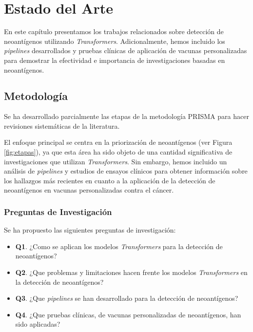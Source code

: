 \chapter{Estado del Arte}
\label{cap:estadodelarte}

En este capítulo presentamos los trabajos relacionados sobre detección de neoantígenos utilizando \textit{Transformers}. Adicionalmente, hemos incluido los \textit{pipelines} desarrollados y pruebas clínicas de aplicación de vacunas personalizadas para demostrar la efectividad e importancia de investigaciones basadas en neoantígenos.

\section{Metodología}

Se ha desarrollado parcialmente las etapas de la metodología PRISMA \citep{yepes2021prisma} para hacer revisiones sistemáticas de la literatura. 

El enfoque principal se centra en la priorización de neoantígenos (ver Figura 	\ref{fig:etapas}), ya que esta área ha sido objeto de una cantidad significativa de investigaciones que utilizan \textit{Transformers}. Sin embargo, hemos incluido un análisis de \textit{pipelines} y estudios de ensayos clínicos para obtener información sobre los hallazgos más recientes en cuanto a la aplicación de la detección de neoantígenos en vacunas personalizadas contra el cáncer. 




\subsection{Preguntas de Investigación}
Se ha propuesto las siguientes preguntas de investigación:
\begin{itemize}
	\item \textbf{Q1}. ¿Como se aplican los modelos \textit{Transformers} para la detección de neoantígenos?
	\item \textbf{Q2}. ¿Que problemas y limitaciones hacen frente los modelos \textit{Transformers} en la detección de neoantígenos?
	\item \textbf{Q3}.  ¿Que \textit{pipelines} se han desarrollado para la detección de neoantígenos?
	\item  \textbf{Q4}.  ¿Que pruebas clínicas, de vacunas personalizadas de neoantígenos, han sido aplicadas?
	
\end{itemize}


